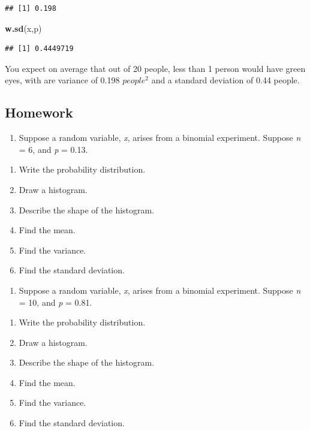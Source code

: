 \documentclass[
]{book}
\newenvironment{Shaded}{\begin{snugshade}}{\end{snugshade}}
\newcommand{\KeywordTok}[1]{\textcolor[rgb]{0.13,0.29,0.53}{\textbf{#1}}}
\newcommand{\NormalTok}[1]{#1}
\providecommand{\tightlist}{%
  \setlength{\itemsep}{0pt}\setlength{\parskip}{0pt}}
\begin{document}
\begin{verbatim}
## [1] 0.198
\end{verbatim}

\begin{Shaded}
\begin{Highlighting}[]
\KeywordTok{w.sd}\NormalTok{(x,p)}
\end{Highlighting}
\end{Shaded}

\begin{verbatim}
## [1] 0.4449719
\end{verbatim}

You expect on average that out of 20 people, less than 1 person would have green eyes, with are variance of 0.198 \(people^2\) and a standard deviation of 0.44 people.

\hypertarget{homework-2}{%
\subsection{Homework}\label{homework-2}}

\begin{enumerate}
\def\labelenumi{\arabic{enumi}.}
\tightlist
\item
  Suppose a random variable, \emph{x}, arises from a binomial experiment. Suppose \emph{n} = 6, and \emph{p} = 0.13.
\end{enumerate}

\begin{enumerate}
\def\labelenumi{\alph{enumi}.}
\tightlist
\item
  Write the probability distribution.
\item
  Draw a histogram.
\item
  Describe the shape of the histogram.
\item
  Find the mean.
\item
  Find the variance.
\item
  Find the standard deviation.
\end{enumerate}

\begin{enumerate}
\def\labelenumi{\arabic{enumi}.}
\setcounter{enumi}{1}
\tightlist
\item
  Suppose a random variable, \emph{x}, arises from a binomial experiment. Suppose \emph{n} = 10, and \emph{p} = 0.81.
\end{enumerate}

\begin{enumerate}
\def\labelenumi{\alph{enumi}.}
\tightlist
\item
  Write the probability distribution.
\item
  Draw a histogram.
\item
  Describe the shape of the histogram.
\item
  Find the mean.
\item
  Find the variance.
\item
  Find the standard deviation.
\end{enumerate}
\end{document}
